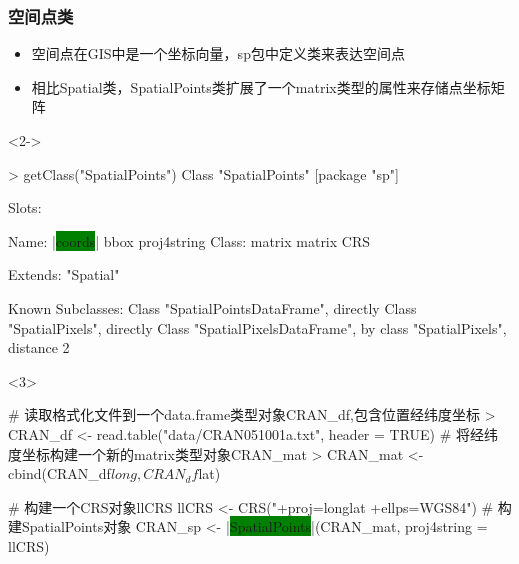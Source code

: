 \subsubsection{空间点类}
\begin{frame}[t,fragile]{\subsecname}{\subsubsecname}
\begin{itemize}
\item<1-> 空间点在GIS中是一个坐标向量，sp包中定义类来表达空间点
\item<2-> 相比Spatial类，SpatialPoints类扩展了一个matrix类型的属性来存储点坐标矩阵
\end{itemize}

\begin{overlayarea}{\textwidth}{\textheight}
\begin{onlyenv}<2->
\begin{rcode}
> getClass("SpatialPoints")
Class "SpatialPoints" [package "sp"]

Slots:
                                          
Name:       |\colorbox{green}{coords}|        bbox proj4string
Class:      matrix      matrix         CRS

Extends: "Spatial"

Known Subclasses: 
Class "SpatialPointsDataFrame", directly
Class "SpatialPixels", directly
Class "SpatialPixelsDataFrame", by class "SpatialPixels", distance 2
\end{rcode}
\end{onlyenv}

\begin{onlyenv}<3>
\begin{rcode}
# 读取格式化文件到一个data.frame类型对象CRAN\_df,包含位置经纬度坐标
> CRAN_df <- read.table("data/CRAN051001a.txt", header = TRUE)
# 将经纬度坐标构建一个新的matrix类型对象CRAN\_mat
> CRAN_mat <- cbind(CRAN_df$long, CRAN_df$lat)

# 构建一个CRS对象llCRS 
llCRS <- CRS("+proj=longlat +ellps=WGS84")
# 构建SpatialPoints对象
CRAN_sp <- |\colorbox{green}{SpatialPoints}|(CRAN_mat, proj4string = llCRS)
\end{rcode}
\end{onlyenv}
\end{overlayarea}
\end{frame}

